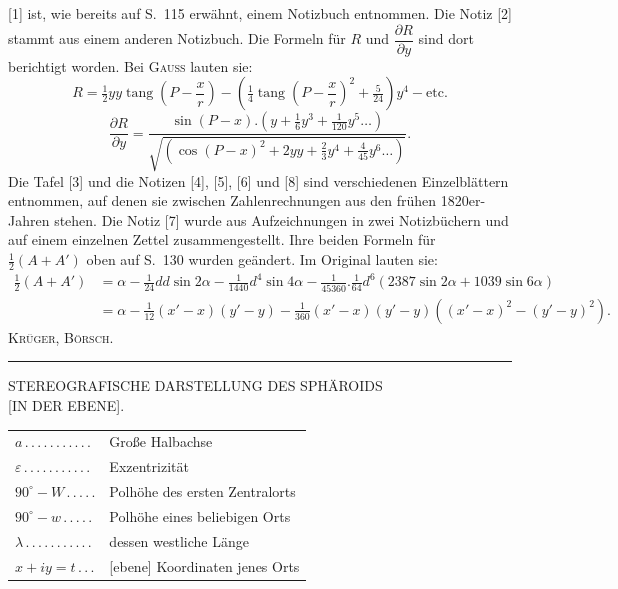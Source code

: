\begingroup\footnotesize
[1] ist, wie bereits auf S.~115 erwähnt, einem Notizbuch entnommen. Die Notiz [2] stammt aus einem anderen Notizbuch. Die Formeln für $R$ und $\dfrac{\partial R}{\partial y}$ sind dort berichtigt worden. Bei \textsc{Gauss} lauten sie:
\[
R=\tfrac12yy\operatorname{tang}\left(P-\frac xr\right)-\left(\tfrac14\operatorname{tang}\left(P-\frac xr\right)^2+\tfrac5{24}\right)y^4-\text{etc.}
\]
\[
\frac{\partial R}{\partial y}=\frac{\sin(P-x).(y+\tfrac16y^3+\tfrac1{120}y^5\ldots)}{\sqrt{(\cos(P-x)^2+2yy+\tfrac23y^4+\tfrac4{45}y^6\ldots)}}.
\]
Die Tafel [3] und die Notizen [4], [5], [6] und [8] sind verschiedenen Einzelblättern entnommen, auf denen sie zwischen Zahlenrechnungen aus den frühen 1820er-Jahren stehen. Die Notiz [7] wurde aus Aufzeichnungen in zwei Notizbüchern und auf einem einzelnen Zettel zusammengestellt. Ihre beiden Formeln für $\tfrac12(A+A')$ oben auf S.~130 wurden geändert. Im Original lauten sie:
\[
\begin{aligned}
\tfrac12(A+A')&=\alpha-\tfrac1{24}dd\sin2\alpha-\tfrac1{1440}d^4\sin4\alpha-\tfrac1{45360}.\tfrac1{64}d^6(2387\sin2\alpha+1039\sin6\alpha)\\
&=\alpha-\tfrac1{12}(x'-x)(y'-y)-\tfrac1{360}(x'-x)(y'-y)((x'-x)^2-(y'-y)^2).
\end{aligned}
\]
\hfill\textsc{Krüger, Börsch.}\par
\begin{center}\rule{.24\textwidth}{.4pt}\end{center}
\par\endgroup\par\endgroup
\clearpage
\begin{center}
{\large STEREOGRAFISCHE DARSTELLUNG DES SPHÄROIDS\\{}[IN DER EBENE].}
\end{center}
\vspace{12mm}
\begin{center}
\begin{tabular}{@{}l@{ }l@{}}
$a\, .\, .\, .\, .\, .\, .\, .\, .\, .\, .\, .$&Große Halbachse\\[3pt]
$\varepsilon\, .\, .\, .\, .\, .\, .\, .\, .\, .\, .\, .$&Exzentrizität\\[3pt]
$90^\circ-W\, .\, .\, .\, .\, .$&Polhöhe des ersten Zentralorts\\[3pt]
$90^\circ-w\, .\, .\, .\, .\, .$&Polhöhe eines beliebigen Orts\\[3pt]
$\lambda\, .\, .\, .\, .\, .\, .\, .\, .\, .\, .\, .$&dessen westliche Länge\\[3pt]
$x+iy=t\, .\, .\, .$&[ebene] Koordinaten jenes Orts
\end{tabular}
\end{center}
